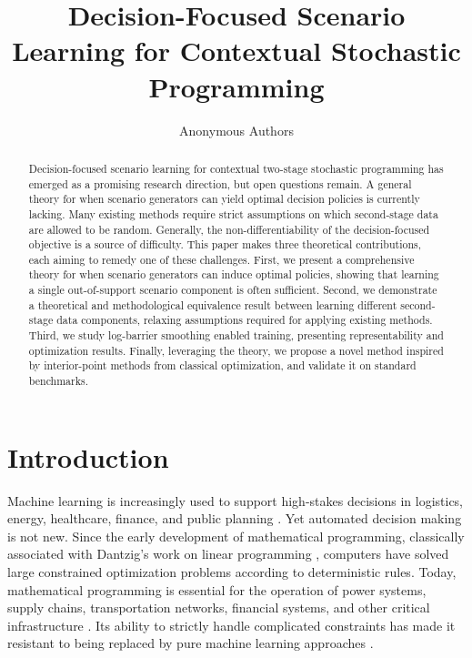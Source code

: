 \documentclass{article}
\title{Decision-Focused Scenario Learning for Contextual Stochastic Programming}
\author{Anonymous Authors}
\newcommand{\1}{\mathbf{1}}
\theoremstyle{plain}
\theoremstyle{definition}
\theoremstyle{remark}
\begin{document}
\maketitle

\begin{abstract}
Decision-focused scenario learning for contextual two-stage stochastic programming has emerged as a promising research direction, but open questions remain. A general theory for when scenario generators can yield optimal decision policies is currently lacking. Many existing methods require strict assumptions on which second-stage data are allowed to be random. Generally, the non-differentiability of the decision-focused objective is a source of difficulty. This paper makes three theoretical contributions, each aiming to remedy one of these challenges. First, we present a comprehensive theory for when scenario generators can induce optimal policies, showing that learning a single out-of-support scenario component is often sufficient. Second, we demonstrate a theoretical and methodological equivalence result between learning different second-stage data components, relaxing assumptions required for applying existing methods. Third, we study log-barrier smoothing enabled training, presenting representability and optimization results. Finally, leveraging the theory, we propose a novel method inspired by interior-point methods from classical optimization, and validate it on standard benchmarks.
\end{abstract}

\section{Introduction}
\label{sec:introduction}

Machine learning is increasingly used to support high-stakes decisions in logistics, energy, healthcare, finance, and public planning \citep{rudin2019stop,bertsimas2020predictive,mandi2024decision}. Yet automated decision making is not new. Since the early development of mathematical programming, classically associated with Dantzig's work on linear programming \citep{dantzig1963linear}, computers have solved large constrained optimization problems according to deterministic rules. Today, mathematical programming is essential for the operation of power systems, supply chains, transportation networks, financial systems, and other critical infrastructure \citep{wood2013power,simchi_levi2014logic,ahuja1993network,markowitz1952portfolio}. Its ability to strictly handle complicated constraints has made it resistant to being replaced by pure machine learning approaches \citep{birge2011introduction}.
\end{document}
